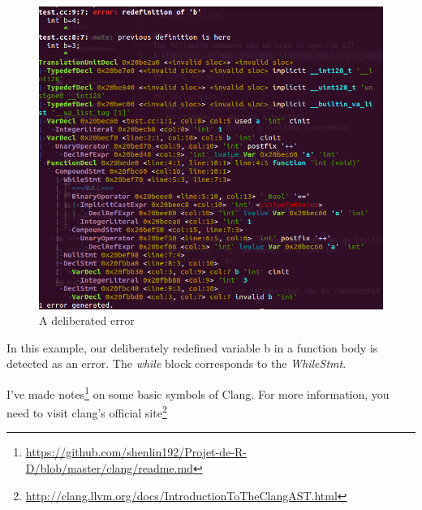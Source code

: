  \begin{figure}
        \centering
        \includegraphics[scale = 0.6]
        {Images/experiments/clangAST2.png}
        \caption[A deliberated error]%
        {A deliberated error}
         \label{fig:ClangAST2}
    \end{figure}
 
 
 In this example, our deliberately redefined variable b in a function body is detected as an error. The \textit{while} block corresponds to the \textit{WhileStmt}.

I've made notes\footnote{\url{https://github.com/shenlin192/Projet-de-R-D/blob/master/clang/readme.md}} on some basic symbols of Clang. For more information, you need to visit clang's official site\footnote{\url{http://clang.llvm.org/docs/IntroductionToTheClangAST.html}}